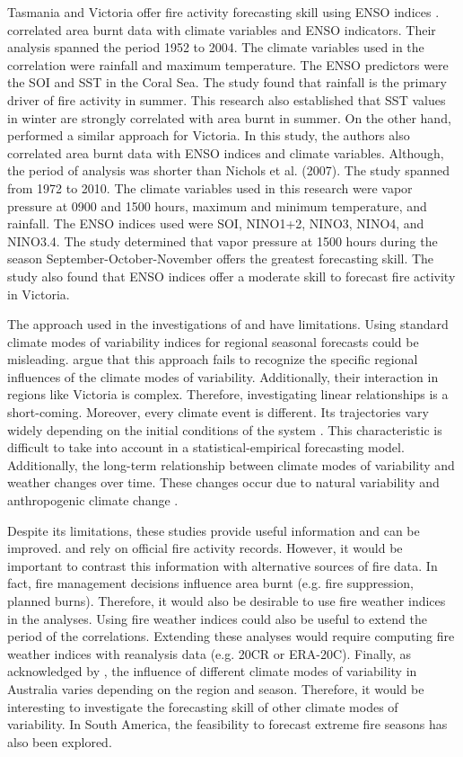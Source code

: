 Tasmania and Victoria offer fire activity forecasting skill using
ENSO indices \citep{Nicholls2007,Harris2013}. \citet{Nicholls2007}
correlated area burnt data with climate variables and ENSO indicators.
Their analysis spanned the period 1952 to 2004. The climate variables
used in the correlation were rainfall and maximum temperature. The
ENSO predictors were the SOI and SST in the Coral Sea. The study found
that rainfall is the primary driver of fire activity in summer. This
research also established that SST values in winter are strongly correlated
with area burnt in summer. On the other hand, \citet{Harris2013}
performed a similar approach for Victoria. In this study, the authors
also correlated area burnt data with ENSO indices and climate variables.
Although, the period of analysis was shorter than Nichols et al. (2007).
The study spanned from 1972 to 2010. The climate variables used in
this research were vapor pressure at 0900 and 1500 hours, maximum
and minimum temperature, and rainfall. The ENSO indices used were
SOI, NINO1+2, NINO3, NINO4, and NINO3.4. The study determined that
vapor pressure at 1500 hours during the season September-October-November
offers the greatest forecasting skill. The study also found that ENSO
indices offer a moderate skill to forecast fire activity in Victoria.

The approach used in the investigations of \citet{Nicholls2007} and
\citet{Harris2013} have limitations. Using standard climate modes
of variability indices for regional seasonal forecasts could be misleading.
\citet{Verdon-Kidd2008a} argue that this approach fails to recognize
the specific regional influences of the climate modes of variability.
Additionally, their interaction in regions like Victoria is complex.
Therefore, investigating linear relationships is a short-coming. Moreover,
every climate event is different. Its trajectories vary widely depending
on the initial conditions of the system \citep{VonStorch2001}. This
characteristic is difficult to take into account in a statistical-empirical
forecasting model. Additionally, the long-term relationship between
climate modes of variability and weather changes over time. These
changes occur due to natural variability and anthropogenic climate
change \citep{Wang2013}. 

Despite its limitations, these studies provide useful information
and can be improved. \citet{Nicholls2007} and \citet{Harris2013}
rely on official fire activity records. However, it would be important
to contrast this information with alternative sources of fire data.
In fact, fire management decisions influence area burnt (e.g. fire
suppression, planned burns). Therefore, it would also be desirable
to use fire weather indices in the analyses. Using fire weather indices
could also be useful to extend the period of the correlations. Extending
these analyses would require computing fire weather indices with reanalysis
data (e.g. 20CR or ERA-20C). Finally, as acknowledged by \citet{Risbey2009b},
the influence of different climate modes of variability in Australia
varies depending on the region and season. Therefore, it would be
interesting to investigate the forecasting skill of other climate
modes of variability. In South America, the feasibility to forecast
extreme fire seasons has also been explored.

